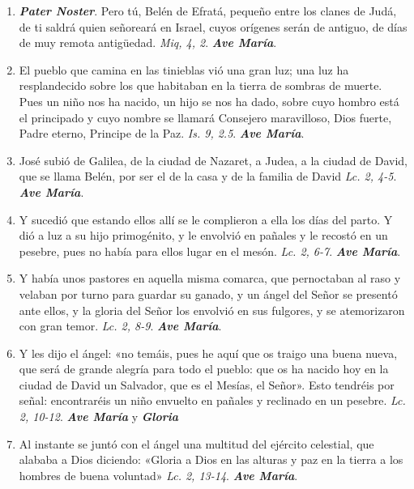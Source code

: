 \documentclass[../../devocionario.tex]{subfiles}
\begin{document}
    \begin{enumerate}
        \item \textbf{\emph{Pater Noster}}. Pero tú, Belén de Efratá, pequeño entre los clanes de Judá, de ti saldrá quien señoreará en Israel, cuyos
            orígenes serán de antiguo, de días de muy remota antigüedad. \emph{Miq, 4, 2}. \textbf{\emph{Ave María}}.

        \item El pueblo que camina en las tinieblas vió una gran luz; una luz ha resplandecido sobre los que habitaban en la tierra de sombras de muerte.
            Pues un niño nos ha nacido, un hijo se nos ha dado, sobre cuyo hombro está el principado y cuyo nombre se llamará Consejero maravilloso, 
            Dios fuerte, Padre eterno, Principe de la Paz. \emph{Is. 9, 2.5}. \textbf{\emph{Ave María}}.

        \item José subió de Galilea, de la ciudad de Nazaret, a Judea, a la ciudad de David, que se llama Belén, por ser el de la casa y de la familia de David 
            \emph{Lc. 2, 4-5}. \textbf{\emph{Ave María}}.

        \item Y sucedió que estando ellos allí se le complieron a ella los días del parto. Y dió a luz a su hijo primogénito, 
            y le envolvió en pañales y le recostó en un pesebre, pues no había para ellos lugar en el mesón. 
            \emph{Lc. 2, 6-7}. \textbf{\emph{Ave María}}.

        \item Y había unos pastores en aquella misma comarca, que pernoctaban al raso y velaban por turno para guardar su ganado, 
            y un ángel del Señor se presentó ante ellos, y la gloria del Señor los envolvió en sus fulgores, y se atemorizaron con gran temor. 
            \emph{Lc. 2, 8-9}. \textbf{\emph{Ave María}}.

        \item Y les dijo el ángel: «no temáis, pues he aquí que os traigo una buena nueva, que será de grande alegría para todo el pueblo: 
            que os ha nacido hoy en la ciudad de David un Salvador, que es el Mesías, el Señor». Esto tendréis por señal: encontraréis un 
            niño envuelto en pañales y reclinado en un pesebre. \emph{Lc. 2, 10-12}. \textbf{\emph{Ave María}} y \textbf{\emph{Gloria}}
        
        \item Al instante se juntó con el ángel una multitud del ejército celestial, que alababa a Dios diciendo: «Gloria a Dios en las alturas y paz en
            la tierra a los hombres de buena voluntad» \emph{Lc. 2, 13-14}. \textbf{\emph{Ave María}}.


\end{enumerate}
\end{document}
